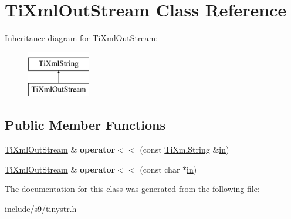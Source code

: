 \hypertarget{classTiXmlOutStream}{\section{\-Ti\-Xml\-Out\-Stream \-Class \-Reference}
\label{classTiXmlOutStream}
}
\-Inheritance diagram for \-Ti\-Xml\-Out\-Stream\-:\begin{figure}[H]
\begin{center}
\leavevmode
\includegraphics[height=2.000000cm]{classTiXmlOutStream}
\end{center}
\end{figure}
\subsection*{\-Public \-Member \-Functions}
\begin{DoxyCompactItemize}
\item 
\hypertarget{classTiXmlOutStream_a3640dcb1c0903be3bc6966cdc9a79db6}{\hyperlink{classTiXmlOutStream}{\-Ti\-Xml\-Out\-Stream} \& {\bfseries operator$<$$<$} (const \hyperlink{classTiXmlString}{\-Ti\-Xml\-String} \&\hyperlink{structin}{in})}\label{classTiXmlOutStream_a3640dcb1c0903be3bc6966cdc9a79db6}

\item 
\hypertarget{classTiXmlOutStream_af2117e5a8cbfcb69544804ad2859bfb6}{\hyperlink{classTiXmlOutStream}{\-Ti\-Xml\-Out\-Stream} \& {\bfseries operator$<$$<$} (const char $\ast$\hyperlink{structin}{in})}\label{classTiXmlOutStream_af2117e5a8cbfcb69544804ad2859bfb6}

\end{DoxyCompactItemize}


\-The documentation for this class was generated from the following file\-:\begin{DoxyCompactItemize}
\item 
include/s9/tinystr.\-h\end{DoxyCompactItemize}
